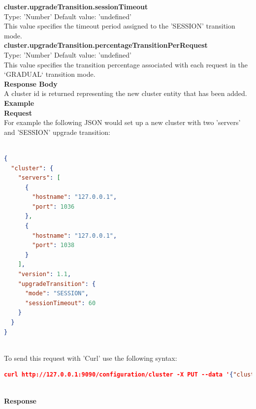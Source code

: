 \documentclass[a4paper,11pt,twoside]{article}
\begin{document}
\noindent
\textbf{cluster.upgradeTransition.sessionTimeout}\\
\noindent
Type: 'Number' Default value: 'undefined'\\
\noindent
This value specifies the timeout period assigned to the 'SESSION' transition mode. \\

\noindent
\textbf{cluster.upgradeTransition.percentageTransitionPerRequest}\\
\noindent
Type: 'Number' Default value: 'undefined'\\
\noindent
This value specifies the transition percentage associated with each request in the `GRADUAL` transition mode. \\

\noindent
\textbf{Response Body}\\
\noindent
A cluster id is returned representing the new cluster entity that has been added. \\

\noindent
\textbf{Example}\\

\noindent
\textbf{Request}\\
\noindent
For example the following JSON would set up a new cluster with two 'servers' and 'SESSION' upgrade transition:

\begin{lstlisting}[language=json,firstnumber=1]

{
  "cluster": {
    "servers": [
      {
        "hostname": "127.0.0.1", 
        "port": 1036
      },  
      {
        "hostname": "127.0.0.1", 
        "port": 1038
      }
    ], 
    "version": 1.1, 
    "upgradeTransition": {
      "mode": "SESSION", 
      "sessionTimeout": 60
    }
  }
}
\end{lstlisting}

\noindent \\
To send this request with 'Curl' use the following syntax:\\

\begin{lstlisting}[language=json,firstnumber=1]
curl http://127.0.0.1:9090/configuration/cluster -X PUT --data '{"cluster": {"servers":[{"hostname": "127.0.0.1", "port": 1036},{"hostname": "127.0.0.1", "port": 1038}],"version": 1.1,"upgradeTransition": { "mode": "SESSION", "sessionTimeout": 60 }}}'
\end{lstlisting}

\noindent \\
\textbf{Response}\\
\end{document}
